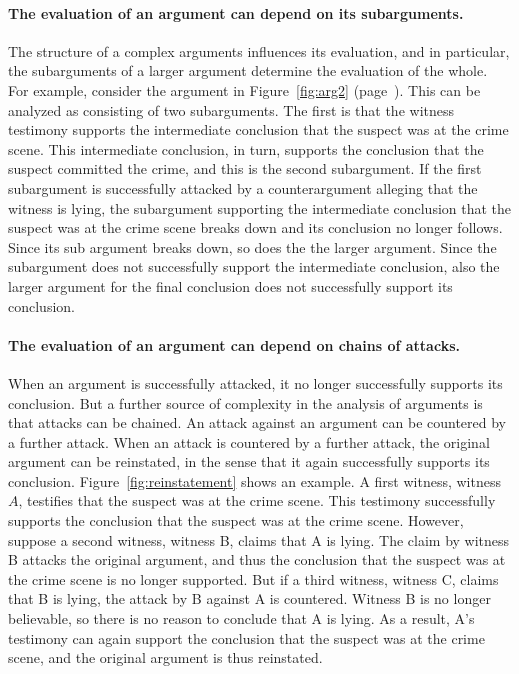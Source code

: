 \documentclass[10pt]{article}
\begin{document}
\paragraph{The evaluation of an argument can depend on its subarguments.} %
The structure of a complex arguments influences its evaluation, and in particular, the subarguments of a larger argument determine the evaluation of the whole. 
For example, consider the argument in Figure~\ref{fig:arg2} (page~\pageref{fig:arg2}). This can be analyzed as consisting of two subarguments.
The first is that the witness testimony supports the intermediate conclusion 
that the suspect was at the crime scene. This intermediate conclusion, in turn, supports the conclusion that 
the suspect committed the crime, and this is the second subargument. If the first subargument is successfully attacked by a counterargument alleging that the witness is lying,  
the subargument supporting the intermediate conclusion that the suspect was at the crime scene breaks down and its conclusion no longer follows. Since its sub argument breaks down, 
so does the the larger argument. Since the subargument does not successfully support the intermediate conclusion, also the larger argument for the final conclusion does not successfully support its conclusion.

\paragraph{The evaluation of an argument can depend on chains of attacks.} When an argument is successfully attacked, it no longer successfully supports its conclusion. But 
a further source of complexity in the analysis of arguments is that attacks can be chained. An attack against an argument can be countered by a further attack. When an attack is countered by a further attack, 
the original argument can be reinstated, in the sense that it again successfully supports its conclusion. Figure~\ref{fig:reinstatement} shows an example. A first witness, witness $A$, testifies that the suspect was at the crime scene. This testimony successfully 
supports the conclusion that the suspect was at the crime scene. However, suppose a second witness, witness B, claims that A is lying. 
The claim by witness B attacks the original argument, and thus 
the conclusion that the suspect was at the crime scene is no longer supported. But if a third witness, witness C, claims that B is lying, 
the attack by B against A is countered. Witness B is no longer believable, so there is no reason to conclude that  A is lying. As a result, A's testimony can 
again support the conclusion that the suspect was at the crime scene, and the original argument is thus reinstated. 
\end{document}
